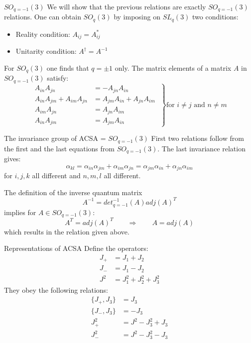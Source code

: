 \documentclass[pdf,colorBG,slideColor,fyma]{prosper}
\newcommand{\anti}[2]{\{#1, #2\}}
\begin{document}
\begin{slide}{$SO_{q = -1}(3)$}
We will show that the previous relations are exactly $SO_{q = -1}(3)$ relations.
\break
\break
One can obtain $SO_q(3)$ by imposing on $SL_q(3)$ two conditions:
\begin{itemize}
  \item{Reality condition: $A_{ij} = A^*_{ij}$}
  \item{Unitarity condition: $A^\dagger = A^{-1}$}
\end{itemize}
For $SO_q(3)$ one finds that $q = \pm 1$ only.
\break
\break
The matrix elements of a matrix $A$ in $SO_{q = -1}(3)$ satisfy:
\[
\left.
\begin{aligned}
A_{in} A_{jn} & = - A_{jn} A_{in} \\
A_{in} A_{jm} + A_{im} A_{jn} & = A_{jm} A_{in} + A_{jn} A_{im} \\
A_{im} A_{jn} & = A_{jn} A_{im} \\
A_{in} A_{jm} &= A_{jm} A_{in}
\end{aligned}\;
\right\}\text{for $i \neq j$ and $n \neq m$}
\]

\end{slide}


\begin{slide}{The invariance group of ACSA = $SO_{q = -1}(3)$}
First two relations follow from the first and the last equations from $SO_{q = -1}(3)$.
\break
\break
The last invariance relation gives:
\[
\alpha_{kl} = \alpha_{in} \alpha_{jm} + \alpha_{im} \alpha_{jn} = \alpha_{jm} \alpha_{in} +  \alpha_{jn} \alpha_{im}
\]
for $i, j, k$ all different and $n, m, l$ all different.

The definition of the inverse quantum matrix
\[
A^{-1} = det_{q = -1}^{-1}(A) adj(A)^T
\]
implies for $A \in SO_{q = -1}(3)$:
\[
A^T = adj(A)^T \qquad \Rightarrow \qquad A = adj(A)
\]
which results in the relation given above.
\end{slide}


\begin{slide}{Representations of ACSA}
Define the operators:
\begin{align*}
J_+ & = J_1 + J_2 \\
J_- & = J_1 - J_2 \\
J^2 & = J_1^2 + J_2^2 + J_3^2
\end{align*}
They obey the following relations:
\begin{align*}
\anti{J_+}{J_3} & = J_3 \\
\anti{J_-}{J_3} & = -J_3 \\
J_+^2 & = J^2 - J_3^2 + J_3 \\
J_-^2 & = J^2 - J_3^2 - J_3
\end{align*}
\end{slide}
\end{document}
